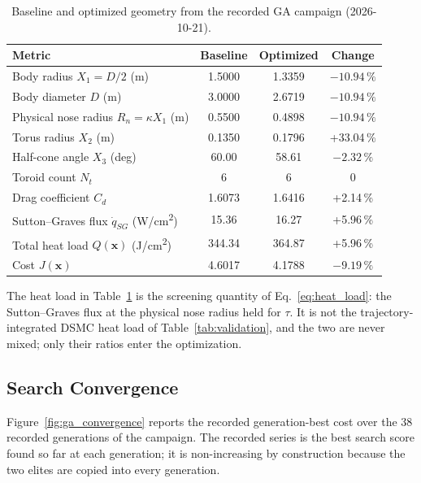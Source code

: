 \begin{table}[H]
    \centering
    \caption{Baseline and optimized geometry from the recorded GA campaign (2026-10-21).}
    \label{tab:ga_before_after}
    \begin{tabular}{lccc}
        \toprule
        \textbf{Metric} & \textbf{Baseline} & \textbf{Optimized} & \textbf{Change} \\
        \midrule
        Body radius $X_1 = D/2$ (m) & 1.5000 & 1.3359 & $-10.94\,\%$ \\
        Body diameter $D$ (m) & 3.0000 & 2.6719 & $-10.94\,\%$ \\
        Physical nose radius $R_n=\kappa X_1$ (m) & 0.5500 & 0.4898 & $-10.94\,\%$ \\
        Torus radius $X_2$ (m) & 0.1350 & 0.1796 & +33.04\,\% \\
        Half-cone angle $X_3$ (deg) & 60.00 & 58.61 & $-2.32\,\%$ \\
        Toroid count $N_t$ & 6 & 6 & 0 \\
        Drag coefficient $C_d$ & 1.6073 & 1.6416 & +2.14\,\% \\
        Sutton--Graves flux $\dot{q}_{SG}$ (W/cm\textsuperscript{2}) & 15.36 & 16.27 & +5.96\,\% \\
        Total heat load $Q(\mathbf{x})$ (J/cm\textsuperscript{2}) & 344.34 & 364.87 & +5.96\,\% \\
        Cost $J(\mathbf{x})$ & 4.6017 & 4.1788 & $-9.19\,\%$ \\
        \bottomrule
    \end{tabular}
\end{table}

The heat load in Table~\ref{tab:ga_before_after} is the screening quantity of Eq.~\eqref{eq:heat_load}: the Sutton--Graves flux at the physical nose radius held for $\tau$. It is not the trajectory-integrated DSMC heat load of Table~\ref{tab:validation}, and the two are never mixed; only their ratios enter the optimization.

\subsection{Search Convergence}
Figure~\ref{fig:ga_convergence} reports the recorded generation-best cost over the 38 recorded generations of the campaign. The recorded series is the best search score found so far at each generation; it is non-increasing by construction because the two elites are copied into every generation.

